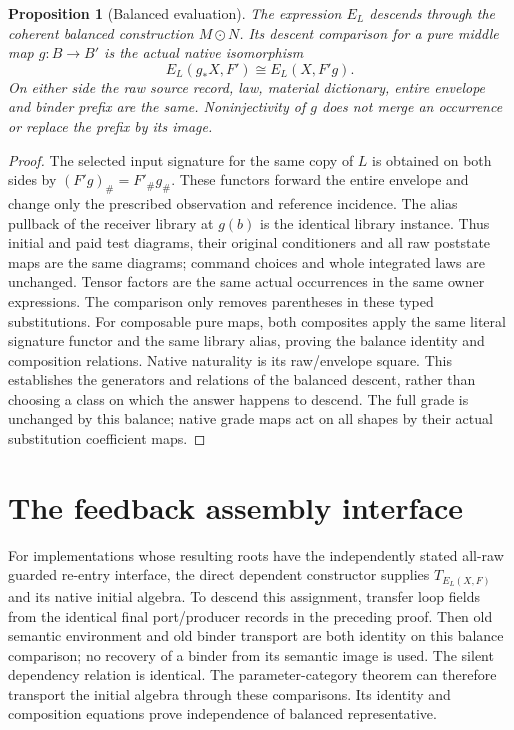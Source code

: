 \documentclass{article}
\newtheorem{proposition}{Proposition}
\begin{document}
\begin{proposition}[Balanced evaluation]
The expression $E_L$ descends through the coherent balanced construction $M\odot N$. Its descent comparison for a pure middle map $g:B\to B'$ is the actual native isomorphism
\[
 E_L(g_*X,F')\cong E_L(X,F'g).
\]
On either side the raw source record, law, material dictionary, entire envelope and binder prefix are the same. Noninjectivity of $g$ does not merge an occurrence or replace the prefix by its image.
\end{proposition}
\begin{proof}
The selected input signature for the same copy of $L$ is obtained on both sides by $(F'g)_\#=F'_\#g_\#$. These functors forward the entire envelope and change only the prescribed observation and reference incidence. The alias pullback of the receiver library at $g(b)$ is the identical library instance. Thus initial and paid test diagrams, their original conditioners and all raw poststate maps are the same diagrams; command choices and whole integrated laws are unchanged. Tensor factors are the same actual occurrences in the same owner expressions. The comparison only removes parentheses in these typed substitutions. For composable pure maps, both composites apply the same literal signature functor and the same library alias, proving the balance identity and composition relations. Native naturality is its raw/envelope square. This establishes the generators and relations of the balanced descent, rather than choosing a class on which the answer happens to descend. The full grade is unchanged by this balance; native grade maps act on all shapes by their actual substitution coefficient maps.
\end{proof}

\section{The feedback assembly interface}
For implementations whose resulting roots have the independently stated all-raw guarded re-entry interface, the direct dependent constructor supplies $T_{E_L(X,F)}$ and its native initial algebra. To descend this assignment, transfer loop fields from the identical final port/producer records in the preceding proof. Then old semantic environment and old binder transport are both identity on this balance comparison; no recovery of a binder from its semantic image is used. The silent dependency relation is identical. The parameter-category theorem can therefore transport the initial algebra through these comparisons. Its identity and composition equations prove independence of balanced representative.
\end{document}
